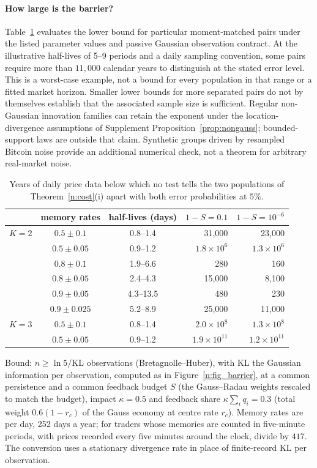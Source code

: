 \documentclass[12pt]{article}
\theoremstyle{definition}
\theoremstyle{remark}
\begin{document}
\paragraph{How large is the barrier?} Table~\ref{n:tab_cal} evaluates the lower bound for particular moment-matched pairs under the listed parameter values and passive Gaussian observation contract. At the illustrative half-lives of 5--9 periods and a daily sampling convention, some pairs require more than $11{,}000$ calendar years to distinguish at the stated error level. This is a worst-case example, not a bound for every population in that range or a fitted market horizon. Smaller lower bounds for more separated pairs do not by themselves establish that the associated sample size is sufficient. Regular non-Gaussian innovation families can retain the exponent under the location-divergence assumptions of Supplement Proposition~\ref{prop:nongauss}; bounded-support laws are outside that claim. Synthetic groups driven by resampled Bitcoin noise provide an additional numerical check, not a theorem for arbitrary real-market noise.

\begin{table}[t]
\centering
\caption{Years of daily price data below which no test tells the two populations of Theorem~\ref{n:cost}(i) apart with both error probabilities at $5\%$.}
\label{n:tab_cal}
\begin{tabular}{cccrr}
\toprule
& memory rates & half-lives (days) & $1-S=0.1$ & $1-S=10^{-6}$\\
\midrule
$K=2$ & $0.5\pm0.1$ & 0.8--1.4 & 31{,}000 & 23{,}000\\
 & $0.5\pm0.05$ & 0.9--1.2 & $1.8\times10^{6}$ & $1.3\times10^{6}$\\
 & $0.8\pm0.1$ & 1.9--6.6 & 280 & 160\\
 & $0.8\pm0.05$ & 2.4--4.3 & 15{,}000 & 8{,}100\\
 & $0.9\pm0.05$ & 4.3--13.5 & 480 & 230\\
 & $0.9\pm0.025$ & 5.2--8.9 & 25{,}000 & 11{,}000\\
\midrule
$K=3$ & $0.5\pm0.1$ & 0.8--1.4 & $2.0\times10^{8}$ & $1.3\times10^{8}$\\
 & $0.5\pm0.05$ & 0.9--1.2 & $1.9\times10^{11}$ & $1.2\times10^{11}$\\
\bottomrule
\end{tabular}
\par\smallskip
\parbox{\textwidth}{\footnotesize Bound: $n\ge\ln 5/\mathrm{KL}$ observations (Bretagnolle--Huber), with KL the Gaussian information per observation, computed as in Figure~\ref{n:fig_barrier}, at a common persistence and a common feedback budget $S$ (the Gauss--Radau weights rescaled to match the budget), impact $\kappa=0.5$ and feedback share $\kappa\sum_iq_i=0.3$ (total weight $0.6(1-r_c)$ of the Gauss economy at centre rate $r_c$). Memory rates are per day, 252 days a year; for traders whose memories are counted in five-minute periods, with prices recorded every five minutes around the clock, divide by $417$. The conversion uses a stationary divergence rate in place of finite-record KL per observation.}
\end{table}
\end{document}
